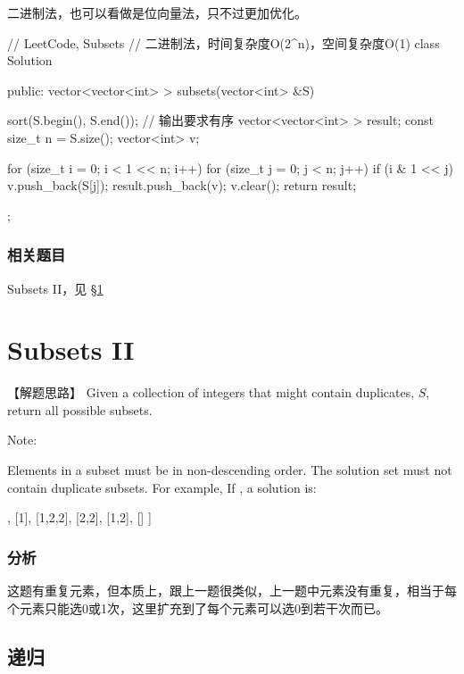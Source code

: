 二进制法，也可以看做是位向量法，只不过更加优化。

\begin{Code}
	// LeetCode, Subsets
	// 二进制法，时间复杂度O(2^n)，空间复杂度O(1)
	class Solution {
		public:
		vector<vector<int> > subsets(vector<int> &S) {
			sort(S.begin(), S.end()); // 输出要求有序
			vector<vector<int> > result;
			const size_t n = S.size();
			vector<int> v;
			
			for (size_t i = 0; i < 1 << n; i++) {
				for (size_t j = 0; j < n; j++) {
					if (i & 1 << j) v.push_back(S[j]);
				}
				result.push_back(v);
				v.clear();
			}
			return result;
		}
	};
\end{Code}


\subsubsection{相关题目}
\begindot
\item Subsets II，见 \S \ref{sec:subsets-ii}
\myenddot


\section{Subsets II} %
\label{sec:subsets-ii}


【解题思路】
Given a collection of integers that might contain duplicates, $S$, return all possible subsets.

Note:

Elements in a subset must be in non-descending order.
The solution set must not contain duplicate subsets.
For example,
If , a solution is:
\begin{Code}
	[
	[2],
	[1],
	[1,2,2],
	[2,2],
	[1,2],
	[]
	]
\end{Code}


\subsubsection{分析}
这题有重复元素，但本质上，跟上一题很类似，上一题中元素没有重复，相当于每个元素只能选0或1次，这里扩充到了每个元素可以选0到若干次而已。


\subsection{递归}


